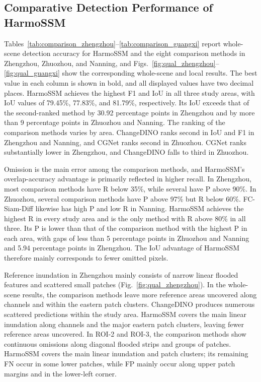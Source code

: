 \documentclass[authoryear,preprint,12pt]{elsarticle}
\newcommand{\floatingtableinput}[1]{%
  \begingroup
  \let\originaltable\table
  \renewcommand{\table}[1][]{\originaltable[!htb]}%
  \endgroup
}
\begin{document}
\subsection{Comparative Detection Performance of HarmoSSM}\label{sec:detection_results}

Tables~\ref{tab:comparison_zhengzhou}--\ref{tab:comparison_guangxi} report whole-scene detection accuracy for HarmoSSM and the eight comparison methods in Zhengzhou, Zhuozhou, and Nanning, and Figs.~\ref{fig:qual_zhengzhou}--\ref{fig:qual_guangxi} show the corresponding whole-scene and local results. The best value in each column is shown in bold, and all displayed values have two decimal places. HarmoSSM achieves the highest F1 and IoU in all three study areas, with IoU values of 79.45\%, 77.83\%, and 81.79\%, respectively. Its IoU exceeds that of the second-ranked method by 30.92 percentage points in Zhengzhou and by more than 9 percentage points in Zhuozhou and Nanning. The ranking of the comparison methods varies by area. ChangeDINO ranks second in IoU and F1 in Zhengzhou and Nanning, and CGNet ranks second in Zhuozhou. CGNet ranks substantially lower in Zhengzhou, and ChangeDINO falls to third in Zhuozhou.

\floatingtableinput{tables/table4_comparison_zhengzhou.tex}

\floatingtableinput{tables/table5_comparison_zhuozhou.tex}

Omission is the main error among the comparison methods, and HarmoSSM's overlap-accuracy advantage is primarily reflected in higher recall. In Zhengzhou, most comparison methods have R below 35\%, while several have P above 90\%. In Zhuozhou, several comparison methods have P above 97\% but R below 60\%. FC-Siam-Diff likewise has high P and low R in Nanning. HarmoSSM achieves the highest R in every study area and is the only method with R above 80\% in all three. Its P is lower than that of the comparison method with the highest P in each area, with gaps of less than 5 percentage points in Zhuozhou and Nanning and 5.94 percentage points in Zhengzhou. The IoU advantage of HarmoSSM therefore mainly corresponds to fewer omitted pixels.

\floatingtableinput{tables/table6_comparison_guangxi.tex}

Reference inundation in Zhengzhou mainly consists of narrow linear flooded features and scattered small patches (Fig.~\ref{fig:qual_zhengzhou}). In the whole-scene results, the comparison methods leave more reference areas uncovered along channels and within the eastern patch clusters. ChangeDINO produces numerous scattered predictions within the study area. HarmoSSM covers the main linear inundation along channels and the major eastern patch clusters, leaving fewer reference areas uncovered. In ROI-2 and ROI-3, the comparison methods show continuous omissions along diagonal flooded strips and groups of patches. HarmoSSM covers the main linear inundation and patch clusters; its remaining FN occur in some lower patches, while FP mainly occur along upper patch margins and in the lower-left corner.
\end{document}
